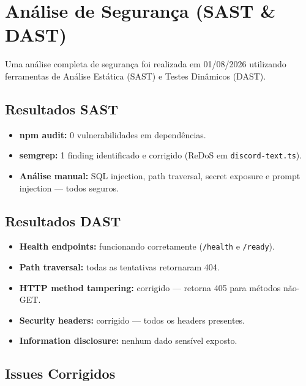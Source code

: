 \documentclass[11pt,a4paper]{article}
\begin{document}
\section{Análise de Segurança (SAST \& DAST)}

Uma análise completa de segurança foi realizada em 01/08/2026 utilizando ferramentas de Análise Estática (SAST) e Testes Dinâmicos (DAST).

\subsection{Resultados SAST}

\begin{itemize}[leftmargin=1.5em, itemsep=0.3em]
  \item \textbf{npm audit:} 0 vulnerabilidades em dependências.
  \item \textbf{semgrep:} 1 finding identificado e corrigido (ReDoS em \texttt{discord-text.ts}).
  \item \textbf{Análise manual:} SQL injection, path traversal, secret exposure e prompt injection — todos seguros.
\end{itemize}

\subsection{Resultados DAST}

\begin{itemize}[leftmargin=1.5em, itemsep=0.3em]
  \item \textbf{Health endpoints:} funcionando corretamente (\texttt{/health} e \texttt{/ready}).
  \item \textbf{Path traversal:} todas as tentativas retornaram 404.
  \item \textbf{HTTP method tampering:} corrigido — retorna 405 para métodos não-GET.
  \item \textbf{Security headers:} corrigido — todos os headers presentes.
  \item \textbf{Information disclosure:} nenhum dado sensível exposto.
\end{itemize}

\subsection{Issues Corrigidos}
\end{document}
